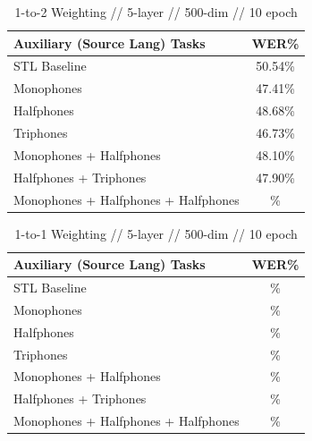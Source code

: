 \documentclass[a4paper]{article}
\begin{document}
\begin{table}[!htbp]
  \centering
    \caption{1-to-2 Weighting // 5-layer // 500-dim //  10 epoch }
  \begin{adjustbox}{width=.45\textwidth}
    \begin{tabular}{lc}
      \toprule
      \textbf{Auxiliary (Source Lang) Tasks} & \textbf{WER\%}\\
      \midrule
      STL Baseline                          &  50.54\% \\
      Monophones                            &  47.41\% \\
      Halfphones                            &  48.68\% \\
      Triphones                             &  46.73\%  \\
      Monophones + Halfphones               &  48.10\%  \\
      Halfphones + Triphones                &  47.90\%  \\
      Monophones + Halfphones + Halfphones  &  \%  \\
      \bottomrule
    \end{tabular}
    \label{table:data}
  \end{adjustbox}
\end{table}


\begin{table}[!htbp]
  \centering
    \caption{1-to-1 Weighting // 5-layer // 500-dim //  10 epoch }
  \begin{adjustbox}{width=.45\textwidth}
    \begin{tabular}{lc}
      \toprule
      \textbf{Auxiliary (Source Lang) Tasks} & \textbf{WER\%}\\
      \midrule
      STL Baseline &  \% \\
      Monophones &  \% \\
      Halfphones &  \% \\
      Triphones &  \%  \\
      Monophones + Halfphones & \%  \\
      Halfphones + Triphones & \%  \\
      Monophones + Halfphones + Halfphones & \%  \\
      \bottomrule
    \end{tabular}
    \label{table:data}
  \end{adjustbox}
\end{table}
\end{document}
